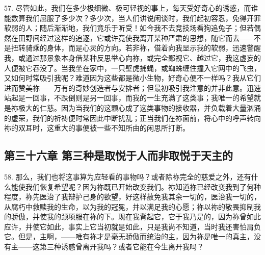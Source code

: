 57. 尽管如此，我们在多少极细微、极可轻视的事上，每天受好奇心的诱惑，而谁能数算我们屈服了多少次？多少次，当人们讲说闲谈时，我们起初容忍，免得开罪软弱的人；随后渐渐地，我们竟乐于听受！如今我不去竞技场看狗追兔子；但若偶然在田野间经过这样的追逐，它或许竟使我离开某种严肃的思想，随它而去——不是扭转骑乘的身体，而是心灵的方向。若非祢，借着向我显示我的软弱，迅速警醒我，或通过那景象本身借某种反思举心向祢，或完全鄙视它、越过它，我这虚妄的人便被它吞没了。当我坐在家中，一只壁虎捕蝇，或蜘蛛缠住撞入它网中的飞虫，又如何时常吸引我呢？难道因为这些都是微小生物，好奇心便不一样吗？我从它们进而赞美祢——万有的奇妙创造者与安排者；但最初吸引我注意的并非此意。迅速站起是一回事，不跌倒则是另一回事，而我的一生充满了这类事；我唯一的希望就是祢极大的仁慈。因为当我们的这颗心成了这类事物的接收器，并负载着大量汹涌的虚荣，我们的祈祷便时常因此中断扰乱；正当我们在祢面前，将心中的呼声转向祢的双耳时，这重大的事便被一些不知所由的闲思所打断。\par


\subsection{第三十六章 第三种是取悦于人而非取悦于天主的}

58. 那么，我们也将这事算为应轻看的事物吗？或者除祢完全的慈爱之外，还有什么能使我们恢复希望呢？因为祢既已开始改变我们。祢知道祢已经改变我到了何种程度，祢先医治了我辩护己身的欲望，好这样赦免我其余一切的，医治我一切的，从腐朽中救赎我的生命，以为我的冠冕，并以满足我的心愿；祢以祢的敬畏抑制我的骄傲，并使我的颈项服在祢的下。现在我背起它，它于我乃是的，因为祢曾如此应许，并使它如此，事实上它当初就是如此，只是我尚不知道，当时我还害怕肩负它。但是，主啊，——唯有祢才是毫无骄傲而统治的主，因为祢是唯一的真主，没有主——这第三种诱惑曾离开我吗？或者它能在今生离开我吗？\par

